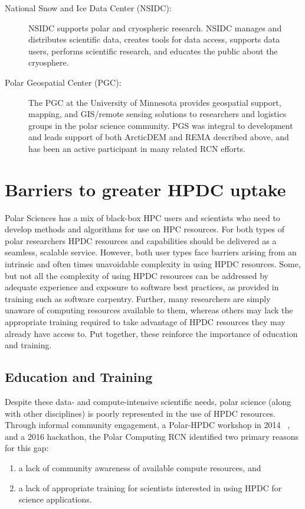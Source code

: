 \documentclass[10pt,letterpaper,draft]{article}
\begin{document}
\begin{description}
\item[National Snow and Ice Data Center (NSIDC):]
 NSIDC supports polar and cryospheric research. NSIDC manages and distributes scientific data, creates tools for data access, supports data users, performs scientific research, and educates the public about the cryosphere.
 
 \item[Polar Geospatial Center (PGC):]
  The PGC at the University of Minnesota provides geospatial support, mapping, and GIS/remote sensing solutions to researchers and logistics groups in the polar science community. PGS was integral to development and leads support of both ArcticDEM and REMA described above, and has been an active participant in many related RCN efforts.

\end{description}

\section*{Barriers to greater HPDC uptake}
Polar Sciences has a mix of black-box HPC users and scientists who need to develop methods and algorithms for use on HPC resources. For both types of polar researchers HPDC resources and capabilities should be delivered as a seamless, scalable service. However, both user types face barriers arising from an intrinsic and often times unavoidable complexity in using HPDC resources. Some, but not all the complexity of using HPDC resources can be addressed by adequate experience and exposure to software best practices, as provided in training such as software carpentry. Further, many researchers are simply unaware of computing resources available to them, whereas others may lack the appropriate training required to take advantage of HPDC resources they may already have access to. Put together, these reinforce the importance of education and training.

\subsection*{Education and Training}
Despite these data- and compute-intensive scientific needs, polar science (along with other disciplines) is poorly represented in the use of HPDC resources. Through informal community engagement, a Polar-HPDC workshop in 2014 ~\cite{hackathon_guide}, and a 2016 hackathon, the Polar Computing RCN identified two primary reasons for this gap:
\begin{enumerate}
\item a lack of community awareness of available compute resources, and
\item a lack of appropriate training for scientists interested in using HPDC for science applications.
\end{enumerate} 
\end{document}
